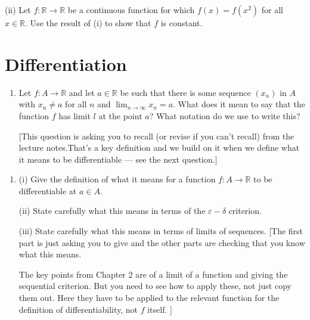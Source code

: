 \documentclass[letterpaper,10pt,english]{jupyterBook}
\begin{document}
\sphinxAtStartPar
(ii) Let \(f: \mathbb{R} \rightarrow \mathbb{R}\) be a continuous function for which \(f(x) = f(x^{2})\) for all \(x \in \mathbb{R}\). Use the result of (i) to show that \(f\) is constant.


\section{Differentiation}
\label{\detokenize{Problems:differentiation}}\label{\detokenize{Problems:ch4prob}}\label{\detokenize{Problems:id37}}\begin{enumerate}
%
\setcounter{enumi}{36}
\item {} 
\sphinxAtStartPar
Let \(f:A\to\mathbb{R}\) and let \(a\in\mathbb{R}\) be such that there is some sequence \((x_n)\) in \(A\) with
\(x_n\neq a\) for all \(n\) and \(\displaystyle\lim_{n\to\infty} x_n=a\). What does it mean to say that
the function \(f\) has limit \(l\) at the point \(a\)? What notation do we use to write this?

{[}This question is asking you to recall (or revise if you can’t recall)  from the lecture notes.That’s a key definition and we build on it when we define what it means to be differentiable — see the next question.{]}

\end{enumerate}
\label{\detokenize{Problems:id38}}\begin{enumerate}
%
\setcounter{enumi}{37}
\item {} 
\sphinxAtStartPar
(i) Give the definition of what it means for a function \(f:A\to\mathbb{R}\) to be differentiable at \(a \in A\).

\sphinxAtStartPar
(ii) State carefully what this means in terms of the \(\varepsilon-\delta\) criterion.

\sphinxAtStartPar
(iii) State carefully what this means in terms of limits of sequences.
{[}The first part is just asking you to give  and the other parts are checking that you know what this means.

The key points from Chapter 2 are  of a limit of a function and  giving the sequential criterion. But you need to see how to apply these, not just copy them out. Here they have to be applied to the relevant function for the definition of differentiability, not \(f\) itself. {]}

\end{enumerate}
\end{document}
